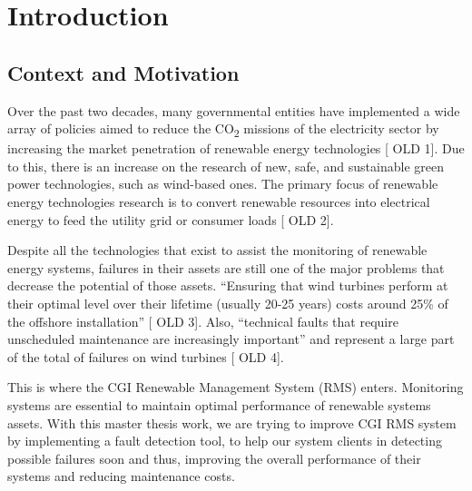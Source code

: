 


\chapter{Introduction}
\label{cha:introduction}

\section{Context and Motivation} 
\label{sub:if_you_use_this_template} 

Over the past two decades, many governmental entities have implemented a wide array of policies aimed to reduce the CO\textsubscript{2} missions of the electricity sector by increasing the market penetration of renewable energy technologies [ OLD 1]. Due to this, there is an increase on the research of new, safe, and sustainable green power technologies, such as wind-based ones. The primary focus of renewable energy technologies research is to convert renewable resources into electrical energy to feed the utility grid or consumer loads [ OLD 2].

Despite all the technologies that exist to assist the monitoring of renewable energy systems, failures in their assets are still one of the major problems that decrease the potential of those assets. “Ensuring that wind turbines perform at their optimal level over their lifetime (usually 20-25 years) costs around 25\%  of the offshore installation” [ OLD 3]. Also, “technical faults that require unscheduled maintenance are increasingly important” and represent a large part of the total of failures on wind turbines [ OLD 4].

This is where the CGI Renewable Management System (RMS) enters. Monitoring systems are essential to maintain optimal performance of renewable systems assets. With this master thesis work, we are trying to improve CGI RMS system by implementing a fault detection tool, to help our system clients in detecting possible failures soon and thus, improving the overall performance of their systems and reducing maintenance costs.


